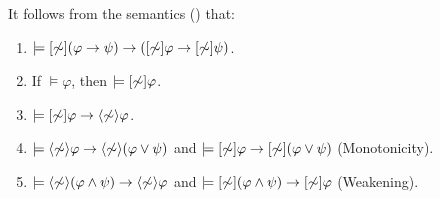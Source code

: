 \begin{proposition}\label{prop:aref-normal-serial}
It follows from the semantics () that:
\begin{enumerate}
\item $\models [\not\sim](\varphi \rightarrow \psi) \rightarrow ([\not\sim]\varphi \rightarrow
[\not\sim]\psi)$.
\item If $\models \varphi$, then $\models [\not\sim]\varphi$.
\item $\models [\not\sim]\varphi \rightarrow \langle \not\sim \rangle\varphi$.


\item $\models \langle \not\sim \rangle \varphi \rightarrow \langle \not\sim \rangle (\varphi \vee \psi)$ and $\models [\not\sim] \varphi \rightarrow [\not\sim] (\varphi \vee \psi)$ (Monotonicity).
\item $\models \langle \not\sim \rangle (\varphi \wedge \psi) \rightarrow \langle \not\sim \rangle \varphi$ and $\models [\not\sim] (\varphi \wedge \psi) \rightarrow [\not\sim] \varphi$ (Weakening).


\end{enumerate}
\end{proposition}
